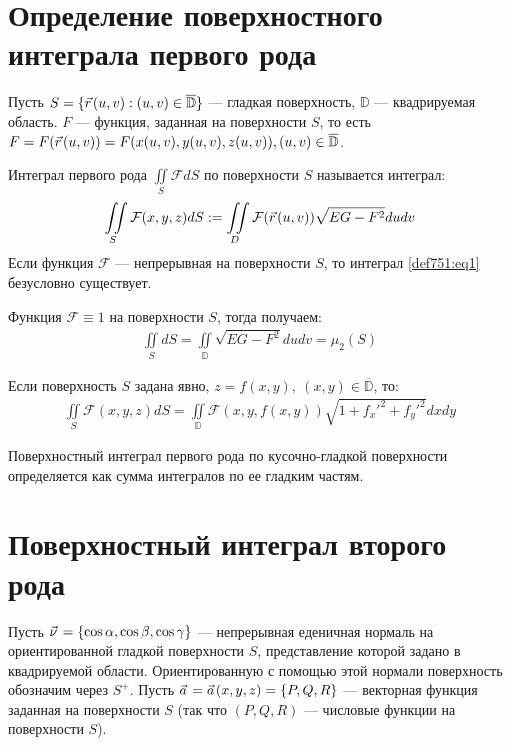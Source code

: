 \section{Определение поверхностного интеграла первого рода}
Пусть $S = \{\pvec r(u,v) : (u, v) \in \overline{\mathbb{D}}\}$ --- гладкая
поверхность, $\mathbb{D}$ --- квадрируемая область. $F$ --- функция, заданная
на поверхности $S$, то есть $F = F(\pvec r(u, v)) = F(x(u, v), y(u, v), z(u,
v)), (u, v) \in \overline{\mathbb{D}}$.

\begin{definition}
  Интеграл первого рода $\iint\limits_S \mathcal{F} dS$ по поверхности $S$ называется
  интеграл:
  \begin{gather}
    \iint\limits_S \mathcal{F}(x, y, z) dS := \iint\limits_D \mathcal{F}(\pvec r(u, v)) \sqrt{EG -
    F^2} du dv
    \label{def751:eq1}
  \end{gather}
  Если функция $\mathcal{F}$ --- непрерывная на поверхности $S$, то интеграл
  \eqref{def751:eq1} безусловно существует.
\end{definition}

\begin{example}
  Функция $\mathcal{F} \equiv 1$ на поверхности $S$, тогда получаем:
  \begin{gather*}
    \iint\limits_S dS = \iint\limits_{\mathbb{D}} \sqrt{EG - F^2} du dv =
    \mu_2(S)
  \end{gather*}
\end{example}

\begin{example}
  Если поверхность $S$ задана явно, $z = f(x, y), \ (x, y) \in
  \overline{\mathbb{D}}$, то:
  \begin{gather*}
    \iint\limits_S \mathcal{F}(x, y, z) dS = \iint\limits_{\mathbb{D}}
    \mathcal{F}(x, y, f(x, y)) \sqrt{1 + f_x'^2 + f_y'^2} dx dy
  \end{gather*}
\end{example}

\begin{definition}
  Поверхностный интеграл первого рода по кусочно-гладкой поверхности
  определяется как сумма интегралов по ее гладким частям.
\end{definition}

\section{Поверхностный интеграл второго рода}
Пусть $\pvec \nu = \{\cos \alpha, \cos \beta, \cos \gamma\}$ --- непрерывная
еденичная нормаль на ориентированной гладкой поверхности $S$, представление
которой задано в квадрируемой области. Ориентированную с помощью этой нормали
поверхность обозначим через $S^+$. Пусть $\pvec a = \pvec a(x, y, z) = \{P, Q,
R\}$ --- векторная функция заданная на поверхности $S$ (так что $(P, Q, R)$ ---
числовые функции на поверхности $S$).

